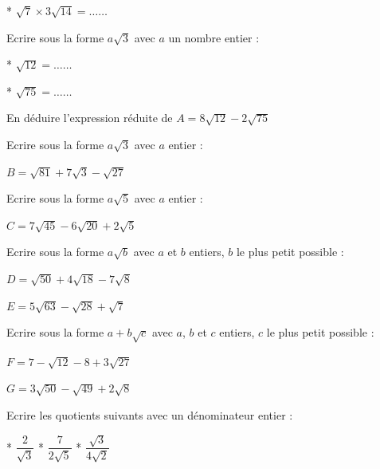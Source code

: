* $\sqrt{7}\times 3\sqrt{14}=\ldots\ldots$

\medskip

\exo

Ecrire sous la forme $a\sqrt{3}$ avec $a$ un nombre entier :

* $\sqrt{12}=\ldots\ldots$

* $\sqrt{75}=\ldots\ldots$

En déduire l'expression réduite de $A = 8\sqrt{12}-2\sqrt{75}$

\dotfill

\medskip

\exo 

Ecrire sous la forme $a\sqrt{3}$ avec $a$ entier :

$B= \sqrt{81}+7\sqrt{3} - \sqrt{27}$


\medskip

\exo 

Ecrire sous la forme $a\sqrt{5}$ avec $a$ entier :

$C = 7\sqrt{45}-6\sqrt{20} + 2\sqrt{5}$

\medskip

\exo 

Ecrire sous la forme $a\sqrt{b}$ avec $a$ et $b$ entiers, $b$ le plus petit possible :

$D = \sqrt{50}+4\sqrt{18} - 7\sqrt{8}$

$E = 5\sqrt{63}-\sqrt{28} + \sqrt{7}$

\medskip

\exo 

Ecrire sous la forme $a+b\sqrt{c}$ avec $a$, $b$ et $c$  entiers, $c$ le plus petit possible :

$F = 7 -\sqrt{12} -8 +3\sqrt{27}$

$G=3\sqrt{50}-\sqrt{49}+2\sqrt{8}$

\medskip

\exo 

Ecrire les quotients suivants avec un dénominateur entier :

* $\dfrac{2}{\sqrt{3}}$
\qquad\qquad
* $\dfrac{7}{2\sqrt{5}}$
\qquad\qquad
* $\dfrac{\sqrt{3}}{4\sqrt{2}}$



